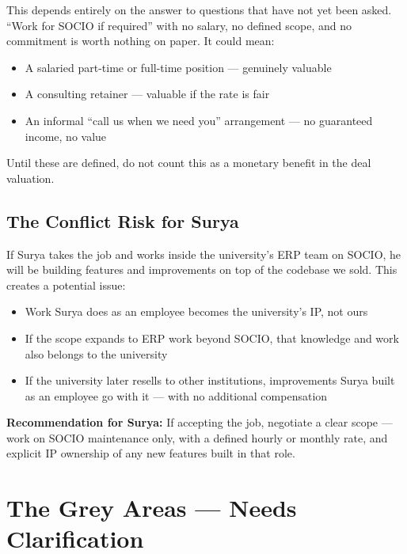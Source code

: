 \documentclass[12pt,a4paper]{article}
\begin{document}
This depends entirely on the answer to questions that have not yet been asked. ``Work for SOCIO if required'' with no salary, no defined scope, and no commitment is worth nothing on paper. It could mean:

\begin{itemize}[leftmargin=*]
    \item A salaried part-time or full-time position — genuinely valuable
    \item A consulting retainer — valuable if the rate is fair
    \item An informal ``call us when we need you'' arrangement — no guaranteed income, no value
\end{itemize}

Until these are defined, do not count this as a monetary benefit in the deal valuation.

\vspace{0.3cm}

\subsection{The Conflict Risk for Surya}

If Surya takes the job and works inside the university's ERP team on SOCIO, he will be building features and improvements on top of the codebase we sold. This creates a potential issue:

\begin{itemize}[leftmargin=*]
    \item Work Surya does as an employee becomes the university's IP, not ours
    \item If the scope expands to ERP work beyond SOCIO, that knowledge and work also belongs to the university
    \item If the university later resells to other institutions, improvements Surya built as an employee go with it — with no additional compensation
\end{itemize}

\textbf{Recommendation for Surya:} If accepting the job, negotiate a clear scope — work on SOCIO maintenance only, with a defined hourly or monthly rate, and explicit IP ownership of any new features built in that role.

\section{The Grey Areas — Needs Clarification}
\end{document}

